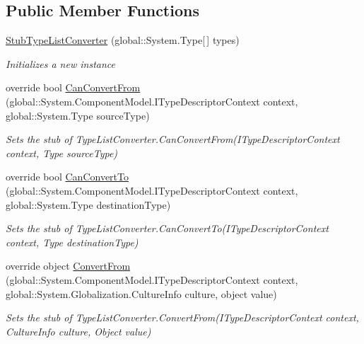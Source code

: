 \subsection*{Public Member Functions}
\begin{DoxyCompactItemize}
\item 
\hyperlink{class_system_1_1_component_model_1_1_fakes_1_1_stub_type_list_converter_adfbc94949e6e986a9e445ea14f838ce8}{Stub\-Type\-List\-Converter} (global\-::\-System.\-Type\mbox{[}$\,$\mbox{]} types)
\begin{DoxyCompactList}\small\item\em Initializes a new instance\end{DoxyCompactList}\item 
override bool \hyperlink{class_system_1_1_component_model_1_1_fakes_1_1_stub_type_list_converter_aba2f447d3ec848da327a5e8c87010d7e}{Can\-Convert\-From} (global\-::\-System.\-Component\-Model.\-I\-Type\-Descriptor\-Context context, global\-::\-System.\-Type source\-Type)
\begin{DoxyCompactList}\small\item\em Sets the stub of Type\-List\-Converter.\-Can\-Convert\-From(\-I\-Type\-Descriptor\-Context context, Type source\-Type)\end{DoxyCompactList}\item 
override bool \hyperlink{class_system_1_1_component_model_1_1_fakes_1_1_stub_type_list_converter_a7e5eb98ac15739069fd487934b41f295}{Can\-Convert\-To} (global\-::\-System.\-Component\-Model.\-I\-Type\-Descriptor\-Context context, global\-::\-System.\-Type destination\-Type)
\begin{DoxyCompactList}\small\item\em Sets the stub of Type\-List\-Converter.\-Can\-Convert\-To(\-I\-Type\-Descriptor\-Context context, Type destination\-Type)\end{DoxyCompactList}\item 
override object \hyperlink{class_system_1_1_component_model_1_1_fakes_1_1_stub_type_list_converter_a22a1530985e6e33c87a6b2ae0ad2870b}{Convert\-From} (global\-::\-System.\-Component\-Model.\-I\-Type\-Descriptor\-Context context, global\-::\-System.\-Globalization.\-Culture\-Info culture, object value)
\begin{DoxyCompactList}\small\item\em Sets the stub of Type\-List\-Converter.\-Convert\-From(\-I\-Type\-Descriptor\-Context context, Culture\-Info culture, Object value)\end{DoxyCompactList}\item 

\end{DoxyCompactItemize}
